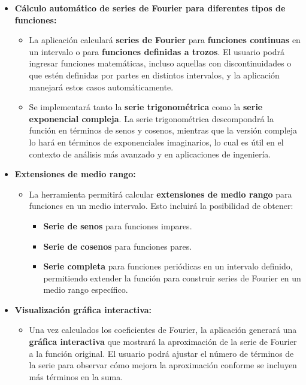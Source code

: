 \begin{itemize}
	\item \textbf{Cálculo automático de series de Fourier para diferentes tipos de funciones:}
	\vspace{-10pt}
	\begin{itemize}
		\item La aplicación calculará \textbf{series de Fourier} para \textbf{funciones continuas} en un intervalo o para \textbf{funciones definidas a trozos}. El usuario podrá ingresar funciones matemáticas, incluso aquellas con discontinuidades o que estén definidas por partes en distintos intervalos, y la aplicación manejará estos casos automáticamente.
		\item Se implementará tanto la \textbf{serie trigonométrica} como la \textbf{serie exponencial compleja}. La serie trigonométrica descompondrá la función en términos de senos y cosenos, mientras que la versión compleja lo hará en términos de exponenciales imaginarios, lo cual es útil en el contexto de análisis más avanzado y en aplicaciones de ingeniería.
	\end{itemize}
	
	\item \textbf{Extensiones de medio rango:}
	\vspace{-10pt}
	\begin{itemize}
		\item La herramienta permitirá calcular \textbf{extensiones de medio rango} para funciones en un medio intervalo. Esto incluirá la posibilidad de obtener:
		\begin{itemize}
			\item \textbf{Serie de senos} para funciones impares.
			\item \textbf{Serie de cosenos} para funciones pares.
			\item \textbf{Serie completa} para funciones periódicas en un intervalo definido, permitiendo extender la función para construir series de Fourier en un medio rango específico.
		\end{itemize}
	\end{itemize}
	
	\item \textbf{Visualización gráfica interactiva:}
	\vspace{-10pt}
	\begin{itemize}
		\item Una vez calculados los coeficientes de Fourier, la aplicación generará una \textbf{gráfica interactiva} que mostrará la aproximación de la serie de Fourier a la función original. El usuario podrá ajustar el número de términos de la serie para observar cómo mejora la aproximación conforme se incluyen más términos en la suma.
	\end{itemize}
	

\end{itemize}
